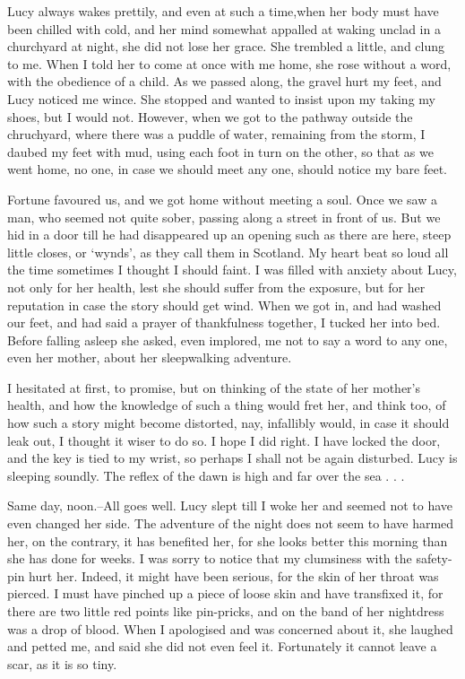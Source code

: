 Lucy always wakes prettily, and even at such a time,when her body must have been chilled with cold, and her mind somewhat appalled at waking unclad in a churchyard at night, she did not lose her grace. She trembled a little, and clung to me. When I told her to come at once with me home, she rose without a word, with the obedience of a child. As we passed along, the gravel hurt my feet, and Lucy noticed me wince. She stopped and wanted to insist upon my taking my shoes, but I would not. However, when we got to the pathway outside the chruchyard, where there was a puddle of water, remaining from the storm, I daubed my feet with mud, using each foot in turn on the other, so that as we went home, no one, in case we should meet any one, should notice my bare feet. 

Fortune favoured us, and we got home without meeting a soul. Once we saw a man, who seemed not quite sober, passing along a street in front of us. But we hid in a door till he had disappeared up an opening such as there are here, steep little closes, or `wynds', as they call them in Scotland. My heart beat so loud all the time sometimes I thought I should faint. I was filled with anxiety about Lucy, not only for her health, lest she should suffer from the exposure, but for her reputation in case the story should get wind. When we got in, and had washed our feet, and had said a prayer of thankfulness together, I tucked her into bed. Before falling asleep she asked, even implored, me not to say a word to any one, even her mother, about her sleepwalking adventure. 

I hesitated at first, to promise, but on thinking of the state of her mother's health, and how the knowledge of such a thing would fret her, and think too, of how such a story might become distorted, nay, infallibly would, in case it should leak out, I thought it wiser to do so. I hope I did right. I have locked the door, and the key is tied to my wrist, so perhaps I shall not be again disturbed. Lucy is sleeping soundly. The reflex of the dawn is high and far over the sea . . . 

Same day, noon.--All goes well. Lucy slept till I woke her and seemed not to have even changed her side. The adventure of the night does not seem to have harmed her, on the contrary, it has benefited her, for she looks better this morning than she has done for weeks. I was sorry to notice that my clumsiness with the safety-pin hurt her. Indeed, it might have been serious, for the skin of her throat was pierced. I must have pinched up a piece of loose skin and have transfixed it, for there are two little red points like pin-pricks, and on the band of her nightdress was a drop of blood. When I apologised and was concerned about it, she laughed and petted me, and said she did not even feel it. Fortunately it cannot leave a scar, as it is so tiny. 

